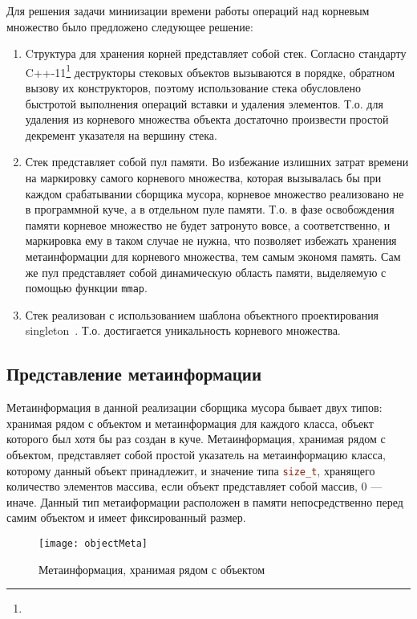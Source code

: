 Для решения задачи миниизации времени работы операций над корневым множество было предложено следующее решение:
\begin{enumerate}
\item Cтруктура для хранения корней представляет собой стек.
Согласно стандарту C++-11\footnote{} деструкторы стековых объектов вызываются в порядке, обратном вызову
их конструкторов, поэтому использование стека обусловлено быстротой выполнения операций вставки и удаления элементов.
Т.о. для удаления из корневого множества объекта достаточно произвести простой декремент указателя на вершину стека.
\item Стек представляет собой пул памяти.
Во избежание излишних затрат времени на маркировку самого корневого множества, которая вызывалась бы при каждом срабатывании
сборщика мусора, корневое множество реализовано не в программной куче, а в отдельном пуле памяти. Т.о. в фазе освобождения
памяти корневое множество не будет затронуто вовсе, а соответственно, и маркировка ему в таком случае не нужна,
что позволяет избежать хранения метаинформации для корневого множества, тем самым экономя память.
Сам же пул представляет собой динамическую область памяти, выделяемую с помощью функции \lstinline[language= cpp]{mmap}.
\item Стек реализован с использованием шаблона объектного проектирования singleton~\cite{patterns}.
Т.о. достигается уникальность корневого множества.
\end{enumerate} 

\subsection{Представление метаинформации}
Метаинформация в данной реализации сборщика мусора бывает двух типов: хранимая рядом с объектом и метаинформация для каждого класса, объект которого был хотя бы раз создан в куче.
Метаинформация, хранимая рядом с объектом, представляет собой простой указатель на метаинформацию класса,
которому данный объект принадлежит, и значение типа \lstinline[language= cpp]{size_t},
хранящего количество элементов массива, если объект представляет собой массив, 0 --- иначе.
Данный тип метаиформации расположен в памяти непосредственно перед самим объектом и имеет фиксированный размер.

\begin{figure}[h!]
	\centering
	\texttt{[image: objectMeta]}
	\caption{Метаинформация, хранимая рядом с объектом}
\end{figure}

